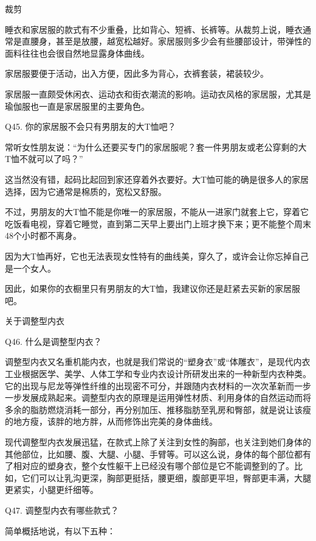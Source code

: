 \documentclass[12pt,UTF8]{ctexbook}
\begin{document}
裁剪

睡衣和家居服的款式有不少重叠，比如背心、短裤、长裤等。从裁剪上说，睡衣通常是直腰身，甚至是放腰，越宽松越好。家居服则多少会有些腰部设计，带弹性的面料往往也会很自然地显露身体曲线。

家居服要便于活动，出入方便，因此多为背心，衣裤套装，裙装较少。

家居服一直颇受休闲衣、运动衣和街衣潮流的影响。运动衣风格的家居服，尤其是瑜伽服也一直是家居服里的主要角色。





Q45. 你的家居服不会只有男朋友的大T恤吧？


常听女性朋友说：“为什么还要买专门的家居服呢？套一件男朋友或老公穿剩的大T恤不就可以了吗？”

这当然没有错，起码比起回到家还穿着外衣要好。大T恤可能的确是很多人的家居选择，因为它通常是棉质的，宽松又舒服。

不过，男朋友的大T恤不能是你唯一的家居服，不能从一进家门就套上它，穿着它吃饭看电视，穿着它睡觉，直到第二天早上要出门上班才换下来；更不能整个周末48个小时都不离身。

因为大T恤再好，它也无法表现女性特有的曲线美，穿久了，或许会让你忘掉自己是一个女人。

因此，如果你的衣橱里只有男朋友的大T恤，我建议你还是赶紧去买新的家居服吧。





关于调整型内衣


Q46. 什么是调整型内衣？


调整型内衣又名重机能内衣，也就是我们常说的“塑身衣”或“体雕衣”，是现代内衣工业根据医学、美学、人体工学和专业内衣设计所研发出来的一种新型内衣种类。它的出现与尼龙等弹性纤维的出现密不可分，并跟随内衣材料的一次次革新而一步一步发展成熟起来。调整型内衣的原理是运用弹性材质、利用身体的自然运动而将多余的脂肪燃烧消耗一部分，再分别加压、推移脂肪至乳房和臀部，就是说让该瘦的地方瘦，该胖的地方胖，从而修饰出完美的身体曲线。

现代调整型内衣发展迅猛，在款式上除了关注到女性的胸部，也关注到她们身体的其他部位，比如腰、腹、大腿、小腿、手臂等。可以这么说，身体的每个部位都有了相对应的塑身衣，整个女性躯干上已经没有哪个部位是它不能调整到的了。比如，它们可以让乳沟更深，胸部更挺括，腰更细，腹部更平坦，臀部更丰满，大腿更紧实，小腿更纤细等。





Q47. 调整型内衣有哪些款式？


简单概括地说，有以下五种：
\end{document}
